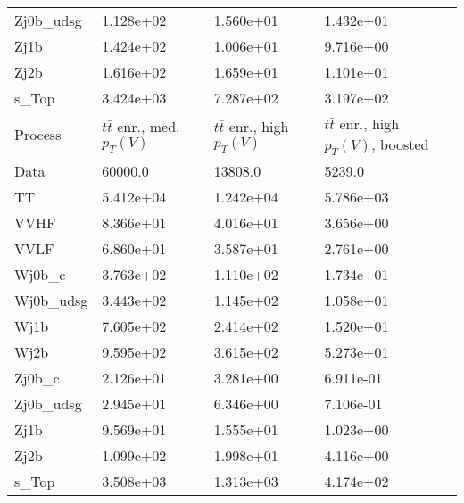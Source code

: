 \begin{table}
{\begin{tabularx}{0.8\textwidth}{|X|X|X|X|}
Zj0b\_udsg & 1.128e+02 & 1.560e+01 & 1.432e+01 \\
Zj1b & 1.424e+02 & 1.006e+01 & 9.716e+00 \\
Zj2b & 1.616e+02 & 1.659e+01 & 1.101e+01 \\
s\_Top & 3.424e+03 & 7.287e+02 & 3.197e+02 \\
\hline
\hline
Process & $t\bar{t}$ enr., med. $p_{T}(V)$ & $t\bar{t}$ enr., high $p_{T}(V)$ & $t\bar{t}$ enr., high $p_{T}(V)$, boosted \\
\hline
Data & 60000.0 & 13808.0 & 5239.0 \\
\hline
TT & 5.412e+04 & 1.242e+04 & 5.786e+03 \\
VVHF & 8.366e+01 & 4.016e+01 & 3.656e+00 \\
VVLF & 6.860e+01 & 3.587e+01 & 2.761e+00 \\
Wj0b\_c & 3.763e+02 & 1.110e+02 & 1.734e+01 \\
Wj0b\_udsg & 3.443e+02 & 1.145e+02 & 1.058e+01 \\
Wj1b & 7.605e+02 & 2.414e+02 & 1.520e+01 \\
Wj2b & 9.595e+02 & 3.615e+02 & 5.273e+01 \\
Zj0b\_c & 2.126e+01 & 3.281e+00 & 6.911e-01 \\
Zj0b\_udsg & 2.945e+01 & 6.346e+00 & 7.106e-01 \\
Zj1b & 9.569e+01 & 1.555e+01 & 1.023e+00 \\
Zj2b & 1.099e+02 & 1.998e+01 & 4.116e+00 \\
s\_Top & 3.508e+03 & 1.313e+03 & 4.174e+02 \\
\hline
\end{tabularx}
}
\label{tab:cr-Wmn-2017}
\end{table}

